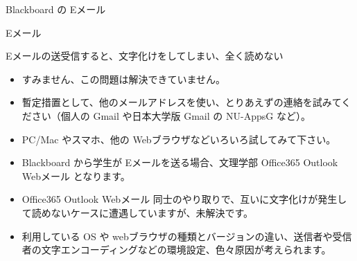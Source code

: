 \documentclass[a4j,10pt]{jsarticle}
\def\lthtmlcheckvsize{\ifdim\ht\sizebox<\vsize 
  \ifdim\wd\sizebox<\hsize\expandafter\hfill\fi \expandafter\vfill
  \else\expandafter\vss\fi}%
\begin{document}
{\begin{frame}[label={sec:org1d63f5a},fragile]{Blackboard の Eメール}
\begin{block}{Eメール}
\begin{block}{Eメールの送受信すると、文字化けをしてしまい、全く読めない}
\begin{itemize}
\item すみません、この問題は解決できていません。
\item 暫定措置として、他のメールアドレスを使い、とりあえずの連絡を試みてください（個人の Gmail や日本大学版 Gmail の NU-AppsG など）。
\item PC/Mac やスマホ、他の Webブラウザなどいろいろ試してみて下さい。
\par
\item Blackboard から学生が Eメールを送る場合、文理学部 Office365 Outlook Webメール となります。
\item Office365 Outlook Webメール 同士のやり取りで、互いに文字化けが発生して読めないケースに遭遇していますが、未解決です。
\par
\item 利用している OS や webブラウザの種類とバージョンの違い、送信者や受信者の文字エンコーディングなどの環境設定、色々原因が考えられます。
\end{itemize}
\end{block}
\end{block}
\end{frame}%
\lthtmlfigureZ
\lthtmlcheckvsize\clearpage}
\end{document}

